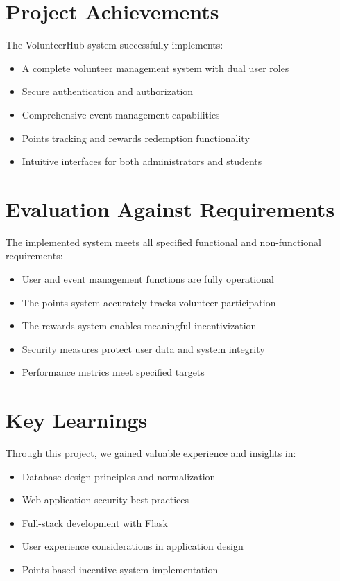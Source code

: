 \documentclass[12pt,a4paper]{report}
\begin{document}
\section{Project Achievements}
The VolunteerHub system successfully implements:

\begin{itemize}
    \item A complete volunteer management system with dual user roles
    \item Secure authentication and authorization
    \item Comprehensive event management capabilities
    \item Points tracking and rewards redemption functionality
    \item Intuitive interfaces for both administrators and students
\end{itemize}

\section{Evaluation Against Requirements}
The implemented system meets all specified functional and non-functional requirements:

\begin{itemize}
    \item User and event management functions are fully operational
    \item The points system accurately tracks volunteer participation
    \item The rewards system enables meaningful incentivization
    \item Security measures protect user data and system integrity
    \item Performance metrics meet specified targets
\end{itemize}

\section{Key Learnings}
Through this project, we gained valuable experience and insights in:

\begin{itemize}
    \item Database design principles and normalization
    \item Web application security best practices
    \item Full-stack development with Flask
    \item User experience considerations in application design
    \item Points-based incentive system implementation
\end{itemize}
\end{document}
